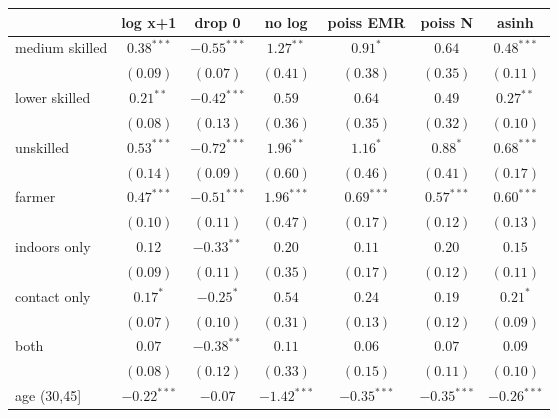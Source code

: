 
\begin{table}[h!]
\begin{center}
\begin{small}
\begin{tabular}{l c c c c c c}
\hline
 & log x+1 & drop 0 & no log & poiss EMR & poiss N  & asinh \\
\hline
medium skilled & $0.38^{***}$  & $-0.55^{***}$ & $1.27^{**}$   & $0.91^{*}$    & $0.64$        & $0.48^{***}$  \\
               & $(0.09)$      & $(0.07)$      & $(0.41)$      & $(0.38)$      & $(0.35)$      & $(0.11)$      \\
lower skilled  & $0.21^{**}$   & $-0.42^{***}$ & $0.59$        & $0.64$        & $0.49$        & $0.27^{**}$   \\
               & $(0.08)$      & $(0.13)$      & $(0.36)$      & $(0.35)$      & $(0.32)$      & $(0.10)$      \\
unskilled      & $0.53^{***}$  & $-0.72^{***}$ & $1.96^{**}$   & $1.16^{*}$    & $0.88^{*}$    & $0.68^{***}$  \\
               & $(0.14)$      & $(0.09)$      & $(0.60)$      & $(0.46)$      & $(0.41)$      & $(0.17)$      \\
farmer         & $0.47^{***}$  & $-0.51^{***}$ & $1.96^{***}$  & $0.69^{***}$  & $0.57^{***}$  & $0.60^{***}$  \\
               & $(0.10)$      & $(0.11)$      & $(0.47)$      & $(0.17)$      & $(0.12)$      & $(0.13)$      \\
indoors only   & $0.12$        & $-0.33^{**}$  & $0.20$        & $0.11$        & $0.20$        & $0.15$        \\
               & $(0.09)$      & $(0.11)$      & $(0.35)$      & $(0.17)$      & $(0.12)$      & $(0.11)$      \\
contact only   & $0.17^{*}$    & $-0.25^{*}$   & $0.54$        & $0.24$        & $0.19$        & $0.21^{*}$    \\
               & $(0.07)$      & $(0.10)$      & $(0.31)$      & $(0.13)$      & $(0.12)$      & $(0.09)$      \\
both           & $0.07$        & $-0.38^{**}$  & $0.11$        & $0.06$        & $0.07$        & $0.09$        \\
               & $(0.08)$      & $(0.12)$      & $(0.33)$      & $(0.15)$      & $(0.11)$      & $(0.10)$      \\
age (30,45]    & $-0.22^{***}$ & $-0.07$       & $-1.42^{***}$ & $-0.35^{***}$ & $-0.35^{***}$ & $-0.26^{***}$ \\

\end{tabular}
\end{small}
\end{center}
\end{table}
